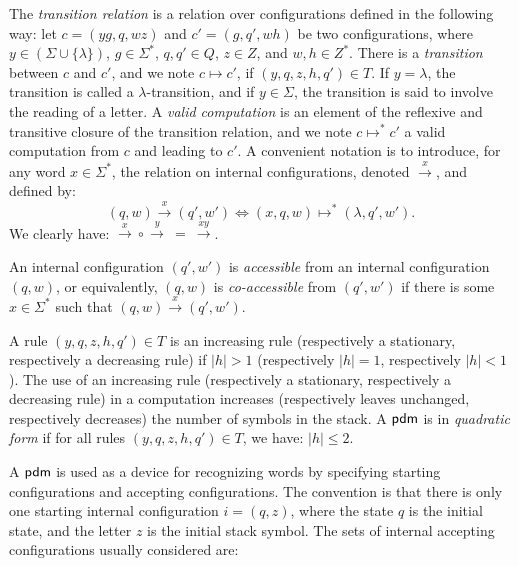 The \emph{transition relation} is a relation over configurations defined in the following way: let $c = (yg, q, wz)$ and $c' = (g, q', wh)$ be two configurations, where $y \in (\Sigma \cup \{\lambda\})$, $g \in \Sigma^*$, $q, q' \in Q$, $z \in Z$, and $w, h \in Z^*$. There is a \emph{transition} between $c$ and $c'$, and we note $c \mapsto c'$, if $(y, q, z, h, q') \in T$. If $y = \lambda$, the transition is called a $\lambda$-transition, and if $y \in \Sigma$, the transition  is said to involve the reading of a letter. A \emph{valid computation} is an element of the reflexive and transitive closure of the transition relation, and we note $c \mapsto^* c'$ a valid computation from $c$ and leading to $c'$. A convenient notation is to introduce, for any word $x \in \Sigma^*$, the relation on internal configurations, denoted $\xrightarrow{x}$, and defined by: $$(q, w) \xrightarrow{x} (q', w') \Leftrightarrow (x, q, w) \mapsto^* (\lambda, q', w').$$ We clearly have: $\xrightarrow{x} \circ \xrightarrow{y}\ =\ \xrightarrow{xy}$.

An internal configuration $(q', w')$ is \emph{accessible} from an internal configuration $(q, w)$, or equivalently, $(q, w)$ is \emph{co-accessible} from $(q', w')$ if there is some $x \in \Sigma^*$ such that $(q, w) \xrightarrow{x} (q', w')$.

A rule $(y, q, z, h, q') \in T$ is an increasing rule (respectively a stationary, respectively a decreasing rule) if $|h| > 1$ (respectively $|h| = 1$, respectively $|h| < 1$). The use of an increasing rule (respectively a stationary, respectively a decreasing rule) in a computation increases (respectively leaves unchanged, respectively decreases) the number of symbols in the stack. A \index{$\pdm$}$\pdm$ is in \emph{quadratic form} if for all rules $(y, q, z, h, q') \in T$, we have: $|h| \le 2$.

A \index{$\pdm$}$\pdm$ is used as a device for recognizing words by specifying starting configurations and accepting configurations. The convention is that there is only one starting internal configuration $i = (q, z)$, where the state $q$ is the initial state, and the letter $z$ is the initial stack symbol. The sets of internal accepting configurations usually considered are:

